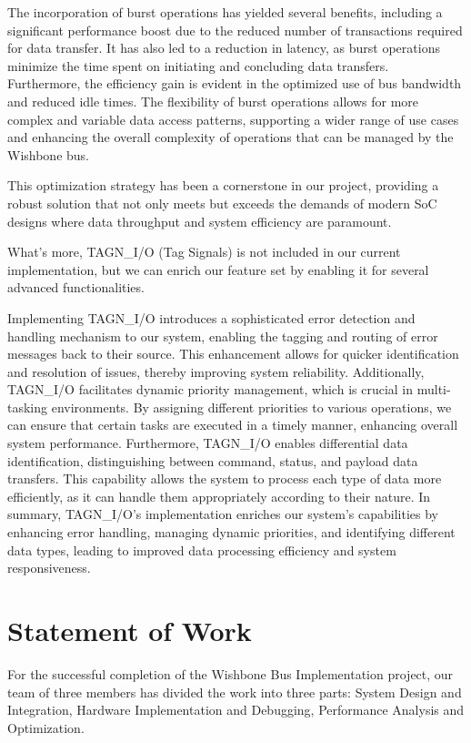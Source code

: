 \documentclass[conference]{IEEEtran}
\begin{document}
The incorporation of burst operations has yielded several benefits, including a significant performance boost due to the reduced number of transactions required for data transfer. It has also led to a reduction in latency, as burst operations minimize the time spent on initiating and concluding data transfers. Furthermore, the efficiency gain is evident in the optimized use of bus bandwidth and reduced idle times. The flexibility of burst operations allows for more complex and variable data access patterns, supporting a wider range of use cases and enhancing the overall complexity of operations that can be managed by the Wishbone bus.

This optimization strategy has been a cornerstone in our project, providing a robust solution that not only meets but exceeds the demands of modern SoC designs where data throughput and system efficiency are paramount.

What's more, TAGN\_I/O (Tag Signals) is not included in our current implementation, but we can enrich our feature set by enabling it for several advanced functionalities.

Implementing TAGN\_I/O introduces a sophisticated error detection and handling mechanism to our system, enabling the tagging and routing of error messages back to their source. This enhancement allows for quicker identification and resolution of issues, thereby improving system reliability. Additionally, TAGN\_I/O facilitates dynamic priority management, which is crucial in multi-tasking environments. By assigning different priorities to various operations, we can ensure that certain tasks are executed in a timely manner, enhancing overall system performance. Furthermore, TAGN\_I/O enables differential data identification, distinguishing between command, status, and payload data transfers. This capability allows the system to process each type of data more efficiently, as it can handle them appropriately according to their nature. In summary, TAGN\_I/O's implementation enriches our system's capabilities by enhancing error handling, managing dynamic priorities, and identifying different data types, leading to improved data processing efficiency and system responsiveness.




\section{Statement of Work}
For the successful completion of the Wishbone Bus Implementation project, our team of three members has divided the work into three parts: System Design and Integration, Hardware Implementation and Debugging, Performance Analysis and Optimization.
\end{document}

